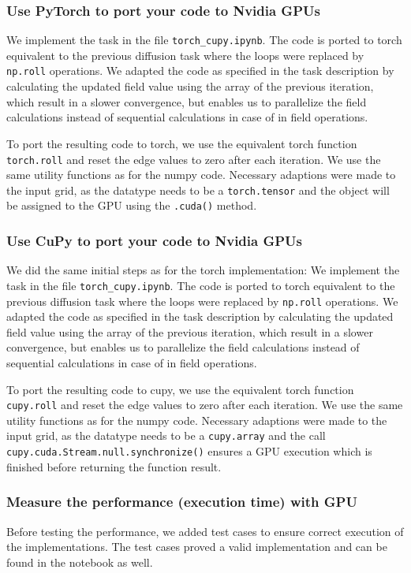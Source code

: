 \documentclass[a4paper,12pt]{article}
\begin{document}
\subsubsection{Use PyTorch to port your code to Nvidia GPUs}
We implement the task in the file \verb|torch_cupy.ipynb|. The code is ported to torch equivalent to the previous diffusion task
where the loops were replaced by \verb|np.roll| operations. We adapted the code as specified in the task description by calculating the
updated field value using the array of the previous iteration, which result in a slower convergence, but enables us to parallelize the field calculations
instead of sequential calculations in case of in field operations.

To port the resulting code to torch, we use the equivalent torch function \verb|torch.roll| and reset the edge values to zero after each iteration. We use the same utility functions as for the numpy code.
Necessary adaptions were made to the input grid, as the datatype needs to be a \verb|torch.tensor| and the object will be assigned to the GPU using the \verb|.cuda()| method.

\subsubsection{Use CuPy to port your code to Nvidia GPUs}
We did the same initial steps as for the torch implementation:
We implement the task in the file \verb|torch_cupy.ipynb|. The code is ported to torch equivalent to the previous diffusion task
where the loops were replaced by \verb|np.roll| operations. We adapted the code as specified in the task description by calculating the
updated field value using the array of the previous iteration, which result in a slower convergence, but enables us to parallelize the field calculations
instead of sequential calculations in case of in field operations.

To port the resulting code to cupy, we use the equivalent torch function \verb|cupy.roll| and reset the edge values to zero after each iteration. We use the same utility functions as for the numpy code.
Necessary adaptions were made to the input grid, as the datatype needs to be a \verb|cupy.array| and the call \verb|cupy.cuda.Stream.null.synchronize()| ensures a GPU execution which is finished before returning the function result.

\subsubsection{Measure the performance (execution time) with GPU}
Before testing the performance, we added test cases to ensure correct execution of the implementations.
The test cases proved a valid implementation and can be found in the notebook as well.
\end{document}
